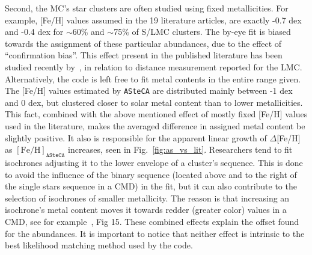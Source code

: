 \documentclass{aa}
\begin{document}
\noindent Second, the MC's star clusters are often studied
using fixed metallicities. For example, [Fe/H] values assumed in the 19
literature articles, are exactly -0.7 dex and -0.4 dex for $\sim$60\% and
$\sim$75\% of S/LMC clusters. The by-eye fit is biased towards the
assignment of these particular abundances, due to the effect
of ``confirmation bias''. This effect present in the published
literature has been studied recently by~\cite{de_Grijs_2014}, in relation to
distance measurement reported for the LMC.\@
Alternatively, the code is left free to fit metal contents in the
entire range given. The [Fe/H] values estimated by \texttt{ASteCA} are
distributed mainly between -1 dex and 0 dex, but clustered closer to solar
metal content than to lower metallicities. This fact, combined with the above
mentioned effect of mostly fixed [Fe/H] values used in the literature, makes the
averaged difference in assigned metal content be slightly positive.
It also is responsible for the apparent linear growth of $\Delta$[Fe/H] as
$\mathrm{[Fe/H]}_{\mathtt{ASteCA}}$ increases, seen in Fig.~\ref{fig:as_vs_lit}.
%
Researchers tend to fit isochrones adjusting it to the lower envelope of a
cluster's sequence. This is done to avoid the influence of the binary
sequence (located above and to the right of the single stars sequence in a CMD)
in the fit, but it can also contribute to the selection of
isochrones of smaller metallicity. The reason is that increasing an
isochrone's metal content moves it towards redder (greater color) values in a
CMD, see for example~\cite{Bressan_2012}, Fig 15.
%
These combined effects explain the offset found for the abundances. It is
important to notice that neither effect is intrinsic to the best likelihood
matching method used by the code.
\end{document}
